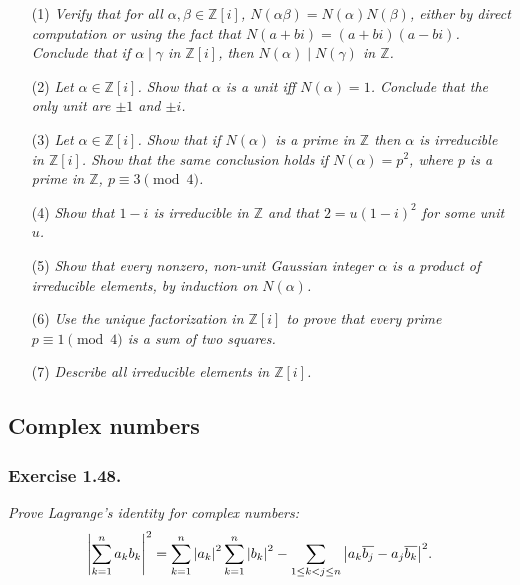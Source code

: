 \documentclass{article}
\begin{document}
\begin{enumerate}
\item[(1)]
\emph{Verify that for all $\alpha, \beta \in \mathbb{Z}[i]$,
$N(\alpha\beta) = N(\alpha)N(\beta)$,
either by direct computation or using the fact that
$N(a+bi) = (a+bi)(a-bi)$.
Conclude that if $\alpha \mid \gamma$ in $\mathbb{Z}[i]$,
then $N(\alpha) \mid N(\gamma)$ in $\mathbb{Z}$.}
\item[(2)]
\emph{Let $\alpha \in \mathbb{Z}[i]$.
Show that $\alpha$ is a unit iff $N(\alpha) = 1$.
Conclude that the only unit are $\pm 1$ and $\pm i$.}
\item[(3)]
\emph{Let $\alpha \in \mathbb{Z}[i]$.
Show that if $N(\alpha)$ is a prime in $\mathbb{Z}$ then
$\alpha$ is irreducible in $\mathbb{Z}[i]$.
Show that the same conclusion holds
if $N(\alpha) = p^2$, where $p$ is a prime in $\mathbb{Z}$,
$p \equiv 3 \pmod{4}$.}
\item[(4)]
\emph{Show that $1-i$ is irreducible in $\mathbb{Z}$
and that $2 = u(1-i)^2$ for some unit $u$.}
\item[(5)]
\emph{Show that every nonzero, non-unit Gaussian integer $\alpha$
is a product of irreducible elements, by induction on $N(\alpha)$.}
\item[(6)]
\emph{Use the unique factorization in $\mathbb{Z}[i]$ to prove that
every prime $p \equiv 1 \pmod{4}$ is a sum of two squares.}
\item[(7)]
\emph{Describe all irreducible elements in $\mathbb{Z}[i]$.}
\end{enumerate}






\subsection*{Complex numbers \\}



\subsubsection*{Exercise 1.48.}
\emph{Prove Lagrange's identity for complex numbers:
$$\abs{ \sum_{k=1}^{n} a_k b_k }^2
= \sum_{k=1}^{n} \abs{a_k}^2 \sum_{k=1}^{n} \abs{b_k}^2
- \sum_{1 \leq k < j \leq n}
\abs{ a_k \overline{b_j} - a_j \overline{b_k} }^2.$$}
\end{document}
